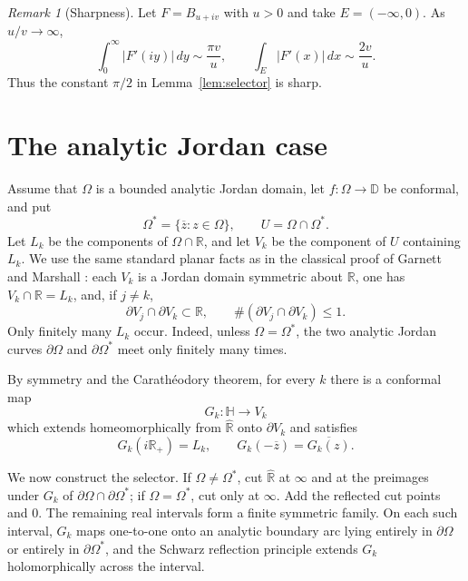 \documentclass[11pt]{article}
\theoremstyle{remark}
\newtheorem{remark}[theorem]{Remark}
\newcommand{\D}{\mathbb D}
\newcommand{\Hh}{\mathbb H}
\newcommand{\R}{\mathbb R}
\newcommand{\Rhat}{\widehat{\mathbb R}}
\begin{document}
\begin{remark}[Sharpness]\label{rem:sharpness}
Let $F=B_{u+iv}$ with $u>0$ and take $E=(-\infty,0)$. As $u/v\to\infty$,
\[
  \int_0^\infty|F'(iy)|\,dy\sim\frac{\pi v}{u},
  \qquad
  \int_E|F'(x)|\,dx\sim\frac{2v}{u}.
\]
Thus the constant $\pi/2$ in Lemma~\ref{lem:selector} is sharp.
\end{remark}

\section{The analytic Jordan case}

Assume that $\Omega$ is a bounded analytic Jordan domain, let
$f:\Omega\to\D$ be conformal, and put
\[
  \Omega^*=\{\overline z:z\in\Omega\},
  \qquad U=\Omega\cap\Omega^*.
\]
Let $L_k$ be the components of $\Omega\cap\R$, and let $V_k$ be the component
of $U$ containing $L_k$. We use the same standard planar facts as in the
classical proof of Garnett and Marshall \cite[pp.~23--25]{GarnettMarshall}:
each $V_k$ is a Jordan domain symmetric about $\R$, one has
$V_k\cap\R=L_k$, and, if $j\ne k$,
\begin{equation}\label{eq:classical-separation}
  \partial V_j\cap\partial V_k\subset\R,
  \qquad
  \#(\partial V_j\cap\partial V_k)\le1.
\end{equation}
Only finitely many $L_k$ occur. Indeed, unless $\Omega=\Omega^*$, the two
analytic Jordan curves $\partial\Omega$ and $\partial\Omega^*$ meet only
finitely many times.

By symmetry and the Carath\'eodory theorem, for every $k$ there is a conformal
map
\begin{equation}\label{eq:Gk}
  G_k:\Hh\to V_k
\end{equation}
which extends homeomorphically from $\Rhat$ onto $\partial V_k$ and satisfies
\begin{equation}\label{eq:Gk-symmetry}
  G_k(i\R_+)=L_k,
  \qquad
  G_k(-\overline z)=\overline{G_k(z)}.
\end{equation}

We now construct the selector. If $\Omega\ne\Omega^*$, cut $\Rhat$ at
$\infty$ and at the preimages under $G_k$ of
$\partial\Omega\cap\partial\Omega^*$; if $\Omega=\Omega^*$, cut only at
$\infty$. Add the reflected cut points and $0$. The remaining real intervals
form a finite symmetric family. On each such interval, $G_k$ maps one-to-one
onto an analytic boundary arc lying entirely in $\partial\Omega$ or entirely
in $\partial\Omega^*$, and the Schwarz reflection principle extends $G_k$
holomorphically across the interval.
\end{document}

